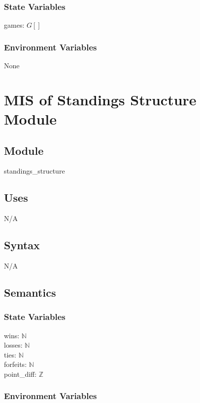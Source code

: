 \documentclass[12pt, titlepage]{article}
\begin{document}
\subsubsection{State Variables}

games: $G[]$

\subsubsection{Environment Variables}

None

\newpage

\section{MIS of Standings Structure Module} \label{mST}

\subsection{Module}

standings\_structure

\subsection{Uses}

N/A

\subsection{Syntax}

N/A

\subsection{Semantics}

\subsubsection{State Variables}

wins: $\mathbb{N}$\\
losses: $\mathbb{N}$\\ 
ties: $\mathbb{N}$\\
forfeits: $\mathbb{N}$\\
point\_diff: $\mathbb{Z}$

\subsubsection{Environment Variables}
\end{document}

